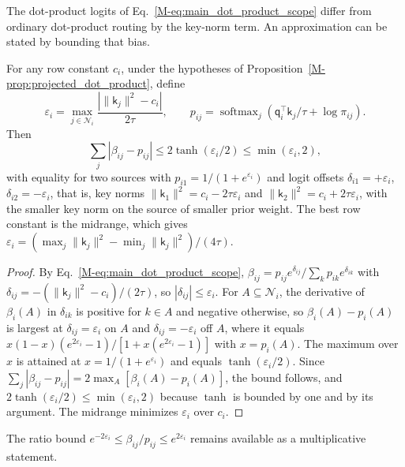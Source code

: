 \documentclass[twoside,11pt]{article}
\newcommand{\softmax}{\operatorname{softmax}}
\begin{document}
The dot-product logits of Eq.~\eqref{M-eq:main_dot_product_scope} differ from ordinary dot-product routing by the key-norm term. An approximation can be stated by bounding that bias.
\begin{proposition}
\label{prop:sharp_bound}
For any row constant $c_i$, under the hypotheses of Proposition~\ref{M-prop:projected_dot_product}, define
\begin{equation}
\varepsilon_i=\max_{j\in\mathcal N_i}
\frac{|\|\mathsf k_j\|^2-c_i|}{2\tau},\qquad
p_{ij}=\softmax_j\left(\mathsf q_i^\top\mathsf k_j/\tau+\log\pi_{ij}\right).
\label{eq:projected_bias_error}
\end{equation}
Then
\begin{equation}
\sum_j|\beta_{ij}-p_{ij}|\le2\tanh(\varepsilon_i/2)\le\min(\varepsilon_i,2),
\label{eq:projected_softmax_bound}
\end{equation}
with equality for two sources with $p_{i1}=1/(1+e^{\varepsilon_i})$ and logit offsets $\delta_{i1}=+\varepsilon_i$, $\delta_{i2}=-\varepsilon_i$, that is, key norms $\|\mathsf k_1\|^2=c_i-2\tau\varepsilon_i$ and $\|\mathsf k_2\|^2=c_i+2\tau\varepsilon_i$, with the smaller key norm on the source of smaller prior weight. The best row constant is the midrange, which gives $\varepsilon_i=(\max_j\|\mathsf k_j\|^2-\min_j\|\mathsf k_j\|^2)/(4\tau)$.
\end{proposition}
\begin{proof}
By Eq.~\eqref{M-eq:main_dot_product_scope}, $\beta_{ij}=p_{ij}e^{\delta_{ij}}/\sum_kp_{ik}e^{\delta_{ik}}$ with $\delta_{ij}=-(\|\mathsf k_j\|^2-c_i)/(2\tau)$, so $|\delta_{ij}|\le\varepsilon_i$. For $A\subseteq\mathcal N_i$, the derivative of $\beta_i(A)$ in $\delta_{ik}$ is positive for $k\in A$ and negative otherwise, so $\beta_i(A)-p_i(A)$ is largest at $\delta_{ij}=\varepsilon_i$ on $A$ and $\delta_{ij}=-\varepsilon_i$ off $A$, where it equals $x(1-x)(e^{2\varepsilon_i}-1)/[1+x(e^{2\varepsilon_i}-1)]$ with $x=p_i(A)$. The maximum over $x$ is attained at $x=1/(1+e^{\varepsilon_i})$ and equals $\tanh(\varepsilon_i/2)$. Since $\sum_j|\beta_{ij}-p_{ij}|=2\max_A[\beta_i(A)-p_i(A)]$, the bound follows, and $2\tanh(\varepsilon_i/2)\le\min(\varepsilon_i,2)$ because $\tanh$ is bounded by one and by its argument. The midrange minimizes $\varepsilon_i$ over $c_i$.
\end{proof}
The ratio bound $e^{-2\varepsilon_i}\le\beta_{ij}/p_{ij}\le e^{2\varepsilon_i}$ remains available as a multiplicative statement.
\end{document}
